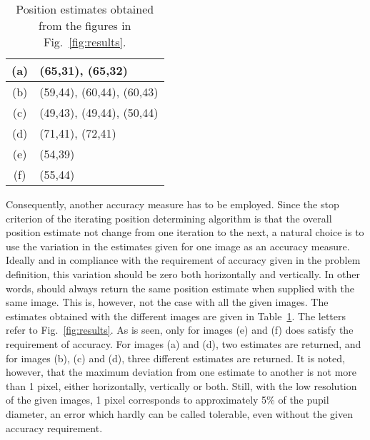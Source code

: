 \begin{table}[tb]
  \begin{center}
    \begin{tabular}{|c|l|}               \hline
      (a) & (65,31), (65,32)          \\ \hline
      (b) & (59,44), (60,44), (60,43) \\ \hline
      (c) & (49,43), (49,44), (50,44) \\ \hline
      (d) & (71,41), (72,41)          \\ \hline
      (e) & (54,39)                   \\ \hline
      (f) & (55,44)                   \\ \hline
    \end{tabular}
  \end{center}
  \caption{\label{tab:estimates}Position estimates obtained from 
    the figures in Fig.~\protect\ref{fig:results}.}
\end{table}

Consequently, another accuracy measure has to be employed.  Since the
stop criterion of the iterating position determining algorithm is that
the overall position estimate not change from one iteration to the
next, a natural choice is to use the variation in the estimates given
for one image as an accuracy measure.  Ideally and in compliance with
the requirement of accuracy given in the problem definition, this
variation should be zero both horizontally and vertically.  In other
words, {\octopus} should always return the same position estimate when
supplied with the same image.  This is, however, not the case with all
the given images.  The estimates obtained with the different images
are given in Table~\ref{tab:estimates}.  The letters refer to
Fig.~\ref{fig:results}.  As is seen, only for images (e) and (f) does
{\octopus} satisfy the requirement of accuracy.  For images (a) and
(d), two estimates are returned, and for images (b), (c) and (d),
three different estimates are returned.  It is noted, however, that
the maximum deviation from one estimate to another is not more than 1
pixel, either horizontally, vertically or both.  Still, with the low
resolution of the given images, 1 pixel corresponds to approximately
5\% of the pupil diameter, an error which hardly can be called
tolerable, even without the given accuracy requirement.

